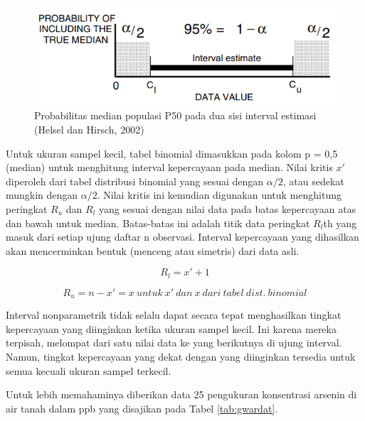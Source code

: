 \documentclass[]{book}
\begin{document}
\begin{figure}

{\centering \includegraphics[width=0.65\linewidth]{iemednp} 

}

\caption{Probabilitas median populasi P50 pada dua sisi interval estimasi (Helsel dan Hirsch, 2002)}\label{fig:iemednp}
\end{figure}

Untuk ukuran sampel kecil, tabel binomial dimasukkan pada kolom p = 0,5
(median) untuk menghitung interval kepercayaan pada median. Nilai kritis
\(x'\) diperoleh dari tabel distribusi binomial yang sesuai dengan
\(\alpha/2\), atau sedekat mungkin dengan \(\alpha/2\). Nilai kritis ini
kemudian digunakan untuk menghitung peringkat \(R_u\) dan \(R_l\) yang
sesuai dengan nilai data pada batas kepercayaan atas dan bawah untuk
median. Batas-batas ini adalah titik data peringkat \(R_l\)th yang masuk
dari setiap ujung daftar n observasi. Interval kepercayaan yang
dihasilkan akan mencerminkan bentuk (menceng atau simetris) dari data
asli.

\begin{equation}
  R_l=x'+1 
  \label{eq:rl}
\end{equation}

\begin{equation}
  R_u=n-x'=x\ untuk\ x'\ dan\ x\ dari\ tabel\ dist.\ binomial 
  \label{eq:ru}
\end{equation}

Interval nonparametrik tidak selalu dapat secara tepat menghasilkan
tingkat kepercayaan yang diinginkan ketika ukuran sampel kecil. Ini
karena mereka terpisah, melompat dari satu nilai data ke yang berikutnya
di ujung interval. Namun, tingkat kepercayaan yang dekat dengan yang
diinginkan tersedia untuk semua kecuali ukuran sampel terkecil.

Untuk lebih memahaminya diberikan data 25 pengukuran konsentrasi arsenin
di air tanah dalam ppb yang disajikan pada Tabel \ref{tab:gwardat}.
\end{document}
